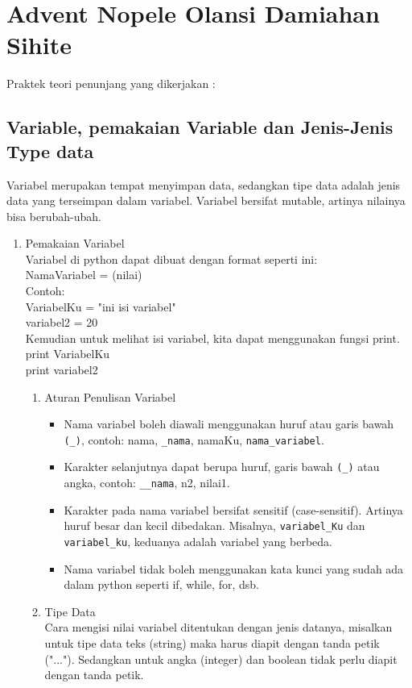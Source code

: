 \section{Advent Nopele Olansi Damiahan Sihite}
Praktek teori penunjang yang dikerjakan :
\subsection{Variable, pemakaian Variable dan Jenis-Jenis Type data}
Variabel merupakan tempat menyimpan data, sedangkan tipe data adalah jenis data yang terseimpan dalam variabel. Variabel bersifat mutable, artinya nilainya bisa berubah-ubah.
\begin{enumerate}
\item Pemakaian Variabel\\
Variabel di python dapat dibuat dengan format seperti ini:\\
NamaVariabel = (nilai)\\
Contoh:\\
VariabelKu = "ini isi variabel"\\
variabel2 = 20\\
Kemudian untuk melihat isi variabel, kita dapat menggunakan fungsi print.\\
print VariabelKu\\
print variabel2\\
\begin{enumerate}
\item Aturan Penulisan Variabel
\begin{itemize}
\item Nama variabel boleh diawali menggunakan huruf atau garis bawah \verb|(_)|, contoh: nama, \verb|_nama|, namaKu, \verb|nama_variabel|.
\item Karakter selanjutnya dapat berupa huruf, garis bawah \verb|(_)| atau angka, contoh: \verb|__nama|, n2, nilai1.
\item Karakter pada nama variabel bersifat sensitif (case-sensitif). Artinya huruf besar dan kecil dibedakan. Misalnya, \verb|variabel_Ku| dan \verb|variabel_ku|, keduanya adalah variabel yang berbeda.
\item Nama variabel tidak boleh menggunakan kata kunci yang sudah ada dalam python seperti if, while, for, dsb.
\end{itemize}
\item Tipe Data\\
Cara mengisi nilai variabel ditentukan dengan jenis datanya, misalkan untuk tipe data teks (string) maka harus diapit dengan tanda petik ("..."). Sedangkan untuk angka (integer) dan boolean tidak perlu diapit dengan tanda petik.\\

\end{enumerate}
\end{enumerate}
